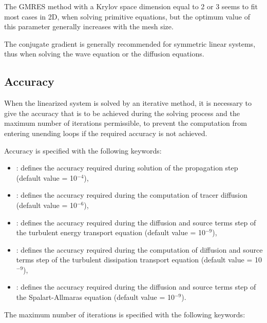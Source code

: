 The GMRES method with a Krylov space dimension equal to 2 or 3 seems
to fit most cases in 2D, when solving primitive equations,
but the optimum value of this parameter generally increases with the mesh size.

The conjugate gradient is generally recommended for symmetric linear systems,
thus when solving the wave equation or the diffusion equations.


\subsection{Accuracy}

When the linearized system is solved by an iterative method, it is necessary
to give the accuracy that is to be achieved during the solving process and
the maximum number of iterations permissible, to prevent the computation
from entering unending loops if the required accuracy is not achieved.

Accuracy is specified with the following keywords:

\begin{itemize}
\item {} : defines the accuracy required during solution
of the propagation step (default value = 10$^{-4}$),

\item {}: defines the accuracy required
during the computation of tracer diffusion (default value = 10$^{-6}$),

\item {}: defines the accuracy required during the diffusion
and source terms step of the turbulent energy transport equation
(default value = 10$^{-9}$),

\item {}: defines the accuracy required during the
computation of diffusion and source terms step of the turbulent dissipation
transport equation (default value = 10$^{-9}$),

\item {}: defines the accuracy required
during the diffusion and source terms step of the Spalart-Allmaras equation
(default value = 10$^{-9}$).
\end{itemize}

The maximum number of iterations is specified with the following keywords:

